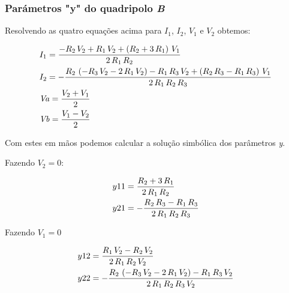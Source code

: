 \documentclass[12pt,twoside, a4paper, twocolumn]{article}
\begin{document}
\subsubsection{Parámetros "y" do quadripolo \emph{B}}


Resolvendo as quatro equações acima para $I_1$, $I_2$, $V_1$ e $V_2$ obtemos:


\begin{equation}
    \begin{aligned}
         & I_{1}={{-R_{2}\,V_{2}+R_{1}\,V_{2}+\left(R_{2}+3\,R_{1}\right)\, V_{1}}\over{2\,R_{1}\,R_{2}}}                                                                \\
         & I_{2}=-{{R_{2}\,\left(-R_{3}\,V_{2}-2\,R_{1}\,V_{2}\right)-R_{1}\, R_{3}\,V_{2}+\left(R_{2}\,R_{3}-R_{1}\,R_{3}\right)\,V_{1}}\over{2\, R_{1}\,R_{2}\,R_{3}}} \\
         & {\it Va}={{V_{2}+V_{1}}\over{2}}                                                                                                                              \\
         & {\it Vb}={{V_{1}-V_{2}}\over{2}}
    \end{aligned}
\end{equation}


Com estes em mãos podemos calcular a solução simbólica dos parâmetros \emph{y}.


Fazendo $V_2 = 0$:


\begin{equation}
    \begin{aligned}
         & y11 = {{R_{2}+3\,R_{1}}\over{2\,R_{1}\,R_{2}}}                    \\
         & y21 = -{{R_{2}\,R_{3}-R_{1}\,R_{3}}\over{2\,R_{1}\,R_{2}\,R_{3}}}
    \end{aligned}
\end{equation}


Fazendo $V_1 = 0$


\begin{equation}
    \begin{aligned}
         & y12 = {{R_{1}\,V_{2}-R_{2}\,V_{2}}\over{2\,R_{1}\,R_{2}\,V_{2}}}                                                      \\
         & y22 = -{{R_{2}\,\left(-R_{3}\,V_{2}-2\,R_{1}\,V_{2}\right)-R_{1}\,R_{3}\, V_{2}}\over{2\,R_{1}\,R_{2}\,R_{3}\,V_{2}}}
    \end{aligned}
\end{equation}
\end{document}
